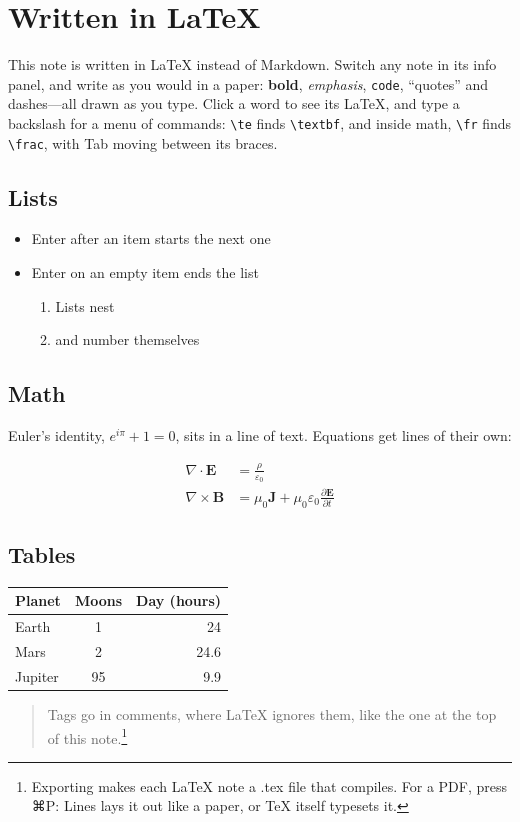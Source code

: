 \section{Written in LaTeX}

This note is written in \LaTeX{} instead of Markdown. Switch any note in its info panel, and write as you would in a paper: \textbf{bold}, \emph{emphasis}, \texttt{code}, ``quotes'' and dashes---all drawn as you type. Click a word to see its LaTeX, and type a backslash for a menu of commands: \texttt{\textbackslash te} finds \texttt{\textbackslash textbf}, and inside math, \texttt{\textbackslash fr} finds \texttt{\textbackslash frac}, with Tab moving between its braces.

\subsection{Lists}
\begin{itemize}
  \item Enter after an item starts the next one
  \item Enter on an empty item ends the list
  \begin{enumerate}
    \item Lists nest
    \item and number themselves
  \end{enumerate}
\end{itemize}

\subsection{Math}
Euler's identity, $e^{i\pi} + 1 = 0$, sits in a line of text. Equations get lines of their own:

\begin{align*}
  \nabla \cdot \mathbf{E} &= \frac{\rho}{\varepsilon_0} \\
  \nabla \times \mathbf{B} &= \mu_0 \mathbf{J} + \mu_0 \varepsilon_0 \frac{\partial \mathbf{E}}{\partial t}
\end{align*}

\subsection{Tables}
\begin{tabular}{lcr}
  Planet & Moons & Day (hours) \\
  \hline
  Earth & 1 & 24 \\
  Mars & 2 & 24.6 \\
  Jupiter & 95 & 9.9 \\
\end{tabular}

\begin{quote}
Tags go in comments, where \LaTeX{} ignores them, like the one at the top of this note.\footnote{Exporting makes each LaTeX note a .tex file that compiles. For a PDF, press ⌘P: Lines lays it out like a paper, or TeX itself typesets it.}
\end{quote}
